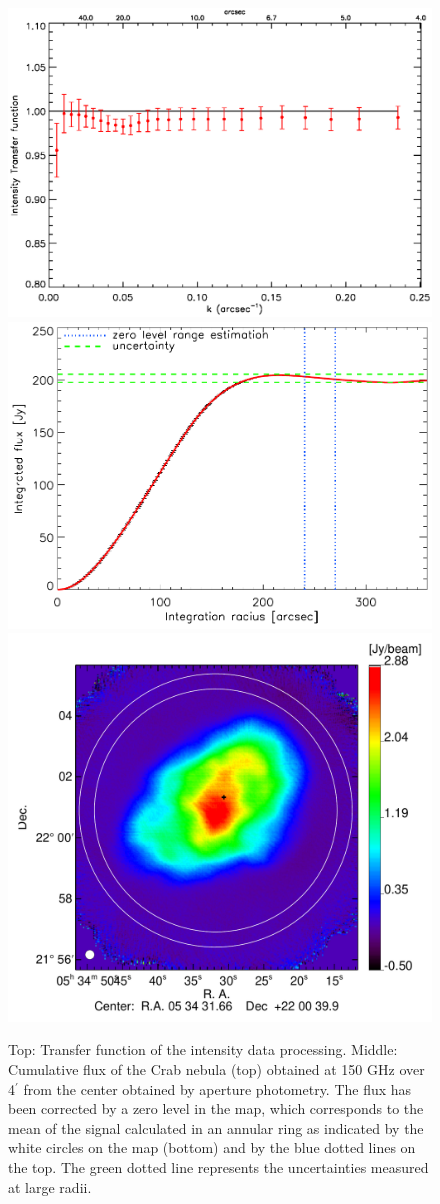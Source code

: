 \documentclass[twocolumn,traditabstract]{aa}
\begin{document}
\begin{figure}[h!]
  \centering
  \includegraphics[width=0.7\linewidth,keepaspectratio]{figures/Crab_transfer_func.eps}
  \includegraphics[width=0.7\linewidth,keepaspectratio]{figures/Crab_integrated_flux_2mm.pdf}
  \includegraphics[width=0.8\linewidth,keepaspectratio]{figures/Crab_I_map2_2mm_ring.pdf}
     \caption{Top: Transfer function of the intensity data processing. Middle:
       Cumulative flux of the Crab nebula (top) obtained at 150 GHz over
       4$^{\prime}$ from the center obtained by aperture photometry. The flux
       has been corrected by a zero level in the map, which corresponds to the
       mean of the signal calculated in an annular ring as indicated by the
       white circles on the map (bottom) and by the blue dotted lines on the
       top. The green dotted line represents the uncertainties measured at large
       radii.}
\label{crab_integrated_flux}
\end{figure}
\end{document}
